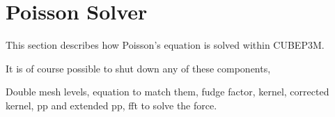 \section{Poisson Solver}
\label{sec:Poisson}


This section describes how Poisson's equation is solved
within {\small CUBEP3M}. 

It is of course possible to shut down any of these components,

Double mesh levels, equation to match them, fudge factor, kernel, 
corrected kernel, pp and extended pp, fft to solve the force. 
